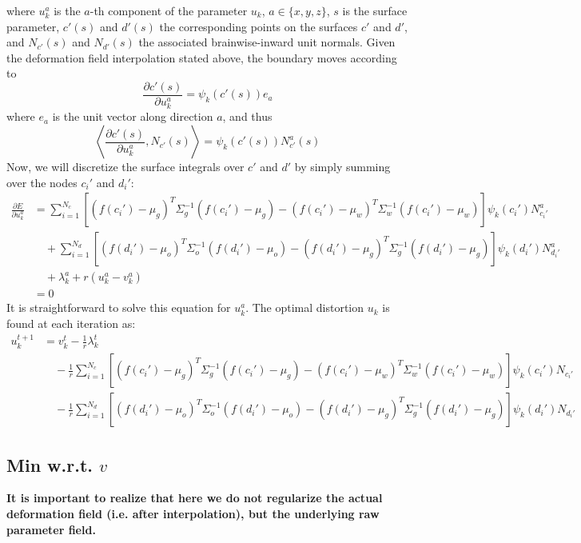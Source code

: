 where $u_k^a$ is the $a$-th component of the parameter $u_k$, $a\in \{x,y,z\}$, $s$ is the surface parameter, $c'(s)$ and $d'(s)$ the corresponding points on the surfaces $c'$ and $d'$, and $N_{c'}(s)$ and $N_{d'}(s)$ the associated brainwise-inward unit normals.
Given the deformation field interpolation stated above, the boundary moves according to
\begin{equation}
\frac{\partial c'(s)}{\partial u_k^a} = \psi_k(c'(s))e_a
\end{equation}
where $e_a$ is the unit vector along direction $a$, and thus
\begin{equation}
\left\langle\frac{\partial c'(s)}{\partial u_k^a}, N_{c'}(s)\right\rangle = \psi_k(c'(s))N_{c'}^a(s)
\end{equation}
Now, we will discretize the surface integrals over $c'$ and $d'$ by simply summing over the nodes $c_i'$ and $d_i'$:
\begin{align}
\frac{\partial E}{\partial u_k^a} &= \sum_{i=1}^{N_c} \left[(f(c_i')-\mu_g)^T\Sigma_g^{-1}(f(c_i')-\mu_g) - (f(c_i')-\mu_w)^T\Sigma_w^{-1}(f(c_i')-\mu_w)\right]\psi_k(c_i')N_{c_i'}^a \nonumber\\
&\quad + \sum_{i=1}^{N_d} \left[(f(d_i')-\mu_o)^T\Sigma_o^{-1}(f(d_i')-\mu_o) - (f(d_i')-\mu_g)^T\Sigma_g^{-1}(f(d_i')-\mu_g)\right]\psi_k(d_i')N_{d_i'}^a \\
&\quad + \lambda_k^a + r(u_k^a - v_k^a)\nonumber\\
& = 0\nonumber
\end{align}
It is straightforward to solve this equation for $u_k^a$. The optimal distortion $u_k$ is found at each iteration as:
\begin{align}
u_k^{t+1} &= v_k^t - \frac{1}{r}\lambda_k^{t}\nonumber\\
&\quad - \frac{1}{r}\sum_{i=1}^{N_c} \left[(f(c_i')-\mu_g)^T\Sigma_g^{-1}(f(c_i')-\mu_g) - (f(c_i')-\mu_w)^T\Sigma_w^{-1}(f(c_i')-\mu_w)\right]\psi_k(c_i')N_{c_i'}\\
&\quad - \frac{1}{r}\sum_{i=1}^{N_d} \left[(f(d_i')-\mu_o)^T\Sigma_o^{-1}(f(d_i')-\mu_o) - (f(d_i')-\mu_g)^T\Sigma_g^{-1}(f(d_i')-\mu_g)\right]\psi_k(d_i')N_{d_i'}\nonumber
\end{align}

\subsection{Min w.r.t. $v$}

\textbf{It is important to realize that here we do not regularize the actual deformation field (i.e. after interpolation), but the underlying raw parameter field. }


